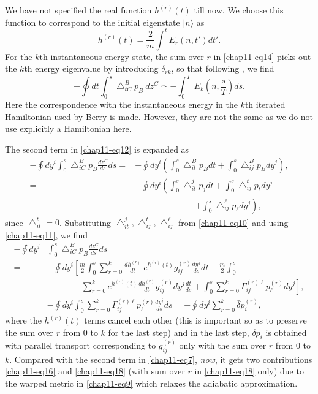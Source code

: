 We have not specified the real function $h^{(r)}(t)$ till now. We choose this function to correspond to the initial
eigenstate $|n\rangle$ as 
\begin{equation}
h^{(r)}(t)= \frac{2}{m}\int^t E_r(n,t') dt'.\label{chap11-eq15}
\end{equation}
For the $k$th instantaneous energy state, the sum over $r$ in \eqref{chap11-eq14} picks out the $k$th energy eigenvalue by  introducing ${\delta}_{rk}$, so that following \cite{chap11-key2}, we find 
\begin{equation}
-\oint dt \int_0^s {\bigtriangleup}^B_{tC}p_B\ dz^C\simeq -\int_0^T\ E_k\left(n,\frac{s}{T}\right) ds. \label{chap11-eq16}
\end{equation}
Here the correspondence with the instantaneous energy in the $k$th iterated Hamiltonian used by Berry \cite{chap11-key5} is made. However, they are not the same as we do not use explicitly a Hamiltonian here.

The second term in \eqref{chap11-eq12} is expanded as  
\begin{align}
	-\oint dy^i\int_0^s{\bigtriangleup}^B_{iC} p_B\frac{dz^C}{ds}ds= &-\oint dy^i\left( \int_0^s {\bigtriangleup}^B_{it}
	p_B dt+\int_0^s{\bigtriangleup}^B_{ij}p_B dy^j\right), \nonumber \\
	= &-\oint dy^i\left(\int_0^s{\bigtriangleup}^j_{it}p_j dt+\int_0^s{\bigtriangleup}^t_{ij}p_t dy^j \right. \nonumber \\
	& \qquad \qquad \qquad \quad \left.+\int_0^s {\bigtriangleup}^{\ell}_{ij}p_{\ell} dy^j\right),\label{chap11-eq17}
\end{align}
since ${\bigtriangleup}^t_{it}=0$. Substituting ${\bigtriangleup}^j_{it}, {\bigtriangleup}^t_{ij},{\bigtriangleup}^{\ell}
_{ij}$ from \eqref{chap11-eq10} and using \eqref{chap11-eq11}, we find 
\begin{align}
	-\oint dy^i & \int_0^s{\bigtriangleup}^B_{iC} p_B\frac{dz^C}{ds}ds\nonumber \\
	= &-\oint dy^i \left[ \frac{m}{2}\int_0^s \sum_{r=0}^k\frac{dh^{(r)}}{dt}\ e^{h^{(r)}(t)}g^{(r)}_{ij}\frac{dy^j}{ds} dt -\frac{m}{2}\int_0^s\right.\nonumber\\ 
	& \qquad \qquad  \left.\sum_{r=0}^k e^{h^{(r)}(t)}\frac{dh^{(r)}}{dt}g^{(r)}_{ij} dy^j\frac{dt}{ds} + \int_0^s\sum_{r=0}^k{\Gamma}^{(r) \ell}_{ij}p_{\ell}^{(r)} dy^j \right], \nonumber \\
	= &-\oint dy^i\int_0^s\sum_{r=0}^k {\Gamma}^{(r)\ell}_{ij}p^{(r)}_{\ell}\frac{dy^j}{ds} ds
	= -\oint dy^i\sum_{r=0}^k \bar{\delta} p_i^{(r)}, \label{chap11-eq18}
\end{align}
where the $h^{(r)}(t)$ terms cancel each other (this is important so as to preserve the sum over $r$ from $0$ to $k$ for  the last step) and in the last step, $\bar{\delta}p_i$ is  obtained with parallel transport corresponding to $g^{(r)}_{ij}$ only with the sum over $r$ from $0$ to $k$.  Compared with the second term in \eqref{chap11-eq7},  {\it{now}}, it gets two contributions \eqref{chap11-eq16} and \eqref{chap11-eq18} (with sum over $r$ in \eqref{chap11-eq18} only)   due to the warped metric in \eqref{chap11-eq9} which relaxes the adiabatic approximation.
\newpage

